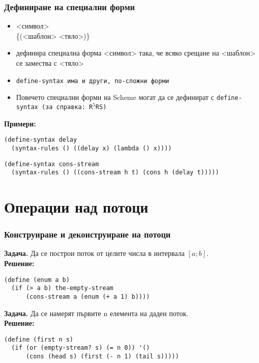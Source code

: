 \documentclass[alsotrans]{beamerswitch}
\begin{document}
\begin{frame}[fragile]
  \frametitle{Дефиниране на специални форми}

  \begin{itemize}[<+->]
  \item {} <символ>\\
    \hspace{2.5em} \{\tta(<шаблон> <тяло>\tta)\}\tta{))}
  \item дефинира специална форма <символ> така, че всяко срещане на <шаблон> се замества с <тяло>
  \item \tt{define-syntax} има и други, по-сложни форми
  \item Повечето специални форми на Scheme могат да се дефинират с \tt{define-syntax} (за справка: R$^5$RS)
  \end{itemize}
  \onslide<+->
  \textbf{Примери:}
  \onslide<+->
\begin{lstlisting}
(define-syntax delay
  (syntax-rules () ((delay x) (lambda () x))))
\end{lstlisting}
  \onslide<+->
\begin{lstlisting}
(define-syntax cons-stream
  (syntax-rules () ((cons-stream h t) (cons h (delay t)))))
\end{lstlisting}
\end{frame}

\section{Операции над потоци}

\begin{frame}[fragile]
  \frametitle{Конструиране и деконструиране на потоци}

  \textbf{Задача.} Да се построи поток от целите числа в интервала $[a; b]$.\\
  \pause
  \textbf{Решение:}
\begin{lstlisting}
(define (enum a b)
  (if (> a b) the-empty-stream
      (cons-stream a (enum (+ a 1) b))))
\end{lstlisting}
  \pause
  \textbf{Задача.} Да се намерят първите n елемента на даден поток.\\
  \pause
  \textbf{Решение:}
\begin{lstlisting}
(define (first n s)
  (if (or (empty-stream? s) (= n 0)) '()
      (cons (head s) (first (- n 1) (tail s)))))
\end{lstlisting}
\end{frame}
\end{document}

